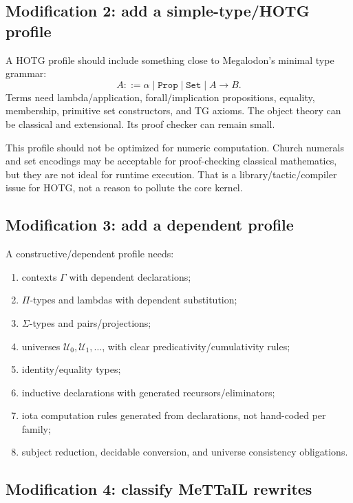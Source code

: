 \documentclass[11pt]{article}
\newcommand{\HOTG}{\textup{HOTG}}
\newcommand{\code}[1]{\texttt{#1}}
\begin{document}
\subsection{Modification 2: add a simple-type/HOTG profile}

A \HOTG{} profile should include something close to Megalodon's minimal type grammar:
\[
A ::= \alpha \mid \code{Prop} \mid \code{Set} \mid A \to B.
\]
Terms need lambda/application, forall/implication propositions, equality, membership, primitive set constructors, and TG axioms.  The object theory can be classical and extensional.  Its proof checker can remain small.

This profile should not be optimized for numeric computation.  Church numerals and set encodings may be acceptable for proof-checking classical mathematics, but they are not ideal for runtime execution.  That is a library/tactic/compiler issue for HOTG, not a reason to pollute the core kernel.

\subsection{Modification 3: add a dependent profile}

A constructive/dependent profile needs:

\begin{enumerate}
\item contexts \(\Gamma\) with dependent declarations;
\item \(\Pi\)-types and lambdas with dependent substitution;
\item \(\Sigma\)-types and pairs/projections;
\item universes \(\mathcal{U}_0,\mathcal{U}_1,\ldots\), with clear predicativity/cumulativity rules;
\item identity/equality types;
\item inductive declarations with generated recursors/eliminators;
\item iota computation rules generated from declarations, not hand-coded per family;
\item subject reduction, decidable conversion, and universe consistency obligations.
\end{enumerate}

\subsection{Modification 4: classify MeTTaIL rewrites}
\end{document}
